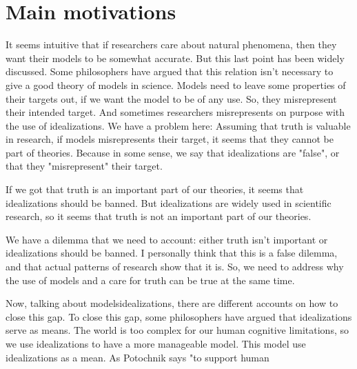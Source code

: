 \section{Main motivations}

It seems intuitive that if researchers care about natural phenomena, then they want their models to be somewhat accurate.
But this last point has been widely discussed.
Some philosophers have argued that this relation isn't necessary to give a good theory of models in science.
Models need to leave some properties of their targets out, if we want the model to be of any use. %
So, they misrepresent their intended target.
And sometimes researchers misrepresents on purpose with the use of idealizations. %
We have a problem here: Assuming that truth is valuable in research, if models misrepresents their target, it seems that they cannot be part of theories.
Because in some sense, we say that idealizations are "false", or that they "misrepresent" their target.

If we got that truth is an important part of our theories, it seems that idealizations should be banned.
But idealizations are widely used in scientific research, so it seems that truth is not an important part of our theories.

We have a dilemma that we need to account: either truth isn't important or idealizations should be banned.
I personally think that this is a false dilemma, and that actual patterns of research show that it is.
So, we need to address why the use of models and a care for truth can be true at the same time.

Now, talking about models\/idealizations, there are different accounts on how to close this gap.
To close this gap, some philosophers have argued that idealizations serve as means.
The world is too complex for our human cognitive limitations, so we use idealizations to have a more manageable model.
This model use idealizations as a mean. As Potochnik says "to support human %

